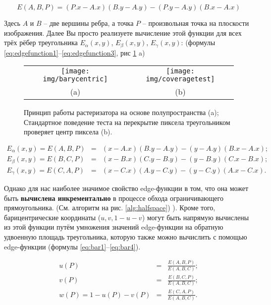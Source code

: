\documentclass[12pt,subf,href,colorlinks=true]{article}
\begin{document}
\begin{equation}\label{eq:edgefunction}
	E(A,B,P) = (P.x - A.x) (B.y - A.y) - (P.y - A.y)(B.x - A.x)
\end{equation}

Здесь $A$ и $B$ -- две вершины ребра, а точка $P$ -- произвольная точка на плоскости изображения. Далее Вы просто реализуете вычисление этой функции для всех трёх рёбер треугольника $E_{\alpha}(x,y)$, $E_{\beta}(x,y)$, $E_{\gamma}(x,y)$: (формулы \ref{eq:edgefunction1}--\ref{eq:edgefunction3}, рис \ref{fig:halfspace_and_coverage} a)

\begin{figure}
	\begin{center}
		\begin{tabular}{c c}
			\texttt{[image: img/barycentric]} &
			\texttt{[image: img/coveragetest]} \\
			 (a) & (b)
		\end{tabular}
		\caption{Принцип работы растеризатора на основе полупространства (a); Стандартное поведение теста на перекрытие пиксела треугольником проверяет центр пиксела (b).}
		\label{fig:halfspace_and_coverage}
	\end{center}
\end{figure}


\begin{eqnarray}\label{eq:edgefunction1}
	E_{\alpha}(x,y) = E(A,B,P) &=& (x - A.x)(B.y - A.y) - (y - A.y)(B.x - A.x); \\  \label{eq:edgefunction2}
	E_{\beta} (x,y) = E(B,C,P) &=& (x - B.x)(C.y - B.y) - (y - B.y)(C.x - B.x); \\ \label{eq:edgefunction3}
	E_{\gamma}(x,y) = E(C,A,P) &=& (x - C.x)(A.y - C.y) - (y - C.y)(A.x - C.x).    \label{eq:edgefunction4}
\end{eqnarray}

Однако для нас наиболее значимое свойство edge-функции в том, что она может быть \textbf{вычислена инкрементально} в процессе обхода ограничивающего прямоугольника. (См. алгоритм на рис. \ref{alg:halfspace}) \cite{Pineda}). Кроме того, барицентрические координаты ($u,v,1-u-v$) могут быть напрямую вычислены из этой функции путём умножения значений edge-функции на обратную удвоенную площадь треугольника, которую также можно вычислить с помощью edge-функции (формулы \ref{eq:bar1}--\ref{eq:bar4}).

\begin{eqnarray}\label{eq:bar1}
	u(P)        &=& \frac{E(A,B,P)}{E(A,B,C)} ;\\ \label{eq:bar2}
	v(P)        &=& \frac{E(B,C,P)}{E(A,B,C)} ;\\ \label{eq:bar3}
	w(P) = 1-u(P)-v(P) &=& \frac{E(C,A,P)}{E(A,B,C)}. \label{eq:bar4}
\end{eqnarray}
\end{document}
